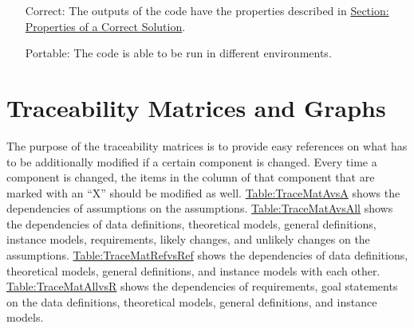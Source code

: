 \documentclass[12pt]{article}
\begin{document}
\begin{itemize}
\item[Correct:\phantomsection\label{correct}]{The outputs of the code have the properties described in \hyperref[Sec:CorSolProps]{Section: Properties of a Correct Solution}.}
\item[Portable:\phantomsection\label{portable}]{The code is able to be run in different environments.}
\end{itemize}
\section{Traceability Matrices and Graphs}
\label{Sec:TraceMatrices}
The purpose of the traceability matrices is to provide easy references on what has to be additionally modified if a certain component is changed. Every time a component is changed, the items in the column of that component that are marked with an ``X'' should be modified as well. \hyperref[Table:TraceMatAvsA]{Table:TraceMatAvsA} shows the dependencies of assumptions on the assumptions. \hyperref[Table:TraceMatAvsAll]{Table:TraceMatAvsAll} shows the dependencies of data definitions, theoretical models, general definitions, instance models, requirements, likely changes, and unlikely changes on the assumptions. \hyperref[Table:TraceMatRefvsRef]{Table:TraceMatRefvsRef} shows the dependencies of data definitions, theoretical models, general definitions, and instance models with each other. \hyperref[Table:TraceMatAllvsR]{Table:TraceMatAllvsR} shows the dependencies of requirements, goal statements on the data definitions, theoretical models, general definitions, and instance models.
\end{document}

